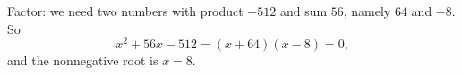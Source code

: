 Factor: we need two numbers with product $-512$ and sum $56$, namely $64$ and $-8$. So
\[
x^2+56x-512=(x+64)(x-8)=0,
\]
and the nonnegative root is $x=\boxed{8}$.

